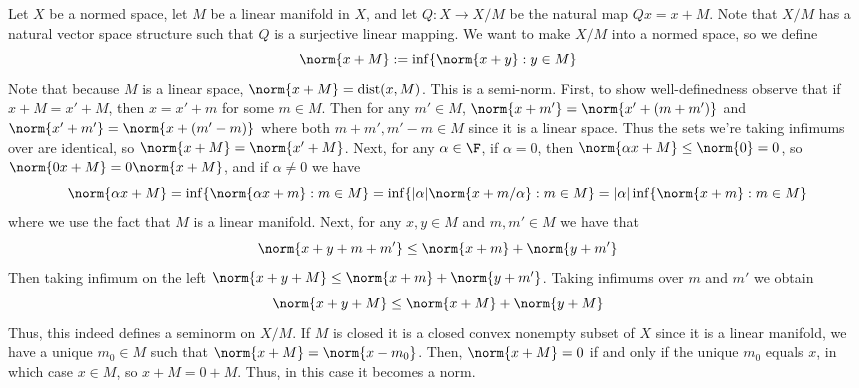 Let $X$ be a normed space, let $M$ be a linear manifold in $X$, and let $Q:X\rightarrow X/M$ be the natural map $Qx = x+M$. Note that $X/M$ has a natural vector space structure such that $Q$ is a surjective linear mapping. We want to make $X/M$ into a normed space, so we define \begin{equation*}
    \norm{x+M} := \inf\{\norm{x+y}:y \in M\}
\end{equation*}
Note that because $M$ is a linear space, $\norm{x+M} = \text{dist}(x,M)$. This is a semi-norm. First, to show well-definedness observe that if $x+M = x'+M$, then $x=x'+m$ for some $m \in M$. Then for any $m' \in M$, $\norm{x+m'} = \norm{x'+(m+m')}$ and $\norm{x'+m'} = \norm{x+(m'-m)}$ where both $m+m',m'-m \in M$ since it is a linear space. Thus the sets we're taking infimums over are identical, so $\norm{x+M} = \norm{x'+M}$. Next, for any $\alpha \in \F$, if $\alpha = 0$, then $\norm{\alpha x+M} \leq \norm{0} = 0$, so $\norm{0 x+M} = 0\norm{x+M}$, and if $\alpha \neq 0$ we have $$\norm{\alpha x+M} =\inf\{\norm{\alpha x+m}:m \in M\} = \inf\{|\alpha|\norm{x+m/\alpha}:m \in M\} = |\alpha|\inf\{\norm{x+m}:m \in M\}$$
where we use the fact that $M$ is a linear manifold. Next, for any $x,y \in M$ and $m,m' \in M$ we have that $$\norm{x+y+m+m'} \leq \norm{x+m}+\norm{y+m'}$$
Then taking infimum on the left $\norm{x+y+M} \leq \norm{x+m}+\norm{y+m'}$. Taking infimums over $m$ and $m'$ we obtain $$\norm{x+y+M} \leq \norm{x+M}+\norm{y+M}$$
Thus, this indeed defines a seminorm on $X/M$. If $M$ is closed it is a closed convex nonempty subset of $X$ since it is a linear manifold, we have a unique $m_0 \in M$ such that $\norm{x+M} = \norm{x-m_0}$. Then, $\norm{x+M} = 0$ if and only if the unique $m_0$ equals $x$, in which case $x \in M$, so $x+M = 0+M$. Thus, in this case it becomes a norm.

